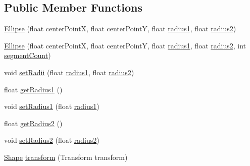 \subsection*{Public Member Functions}
\begin{DoxyCompactItemize}
\item 
\mbox{\hyperlink{classorg_1_1newdawn_1_1slick_1_1geom_1_1_ellipse_ad1dbc867cd52f0db070b125471dc2bf6}{Ellipse}} (float center\+PointX, float center\+PointY, float \mbox{\hyperlink{classorg_1_1newdawn_1_1slick_1_1geom_1_1_ellipse_a26f6d13c3b22a475bc1caf33f84a24b9}{radius1}}, float \mbox{\hyperlink{classorg_1_1newdawn_1_1slick_1_1geom_1_1_ellipse_ad3152cb17acd020ac3ae7bf70526ae9f}{radius2}})
\item 
\mbox{\hyperlink{classorg_1_1newdawn_1_1slick_1_1geom_1_1_ellipse_a01c29689a6bf2672877b1ba6b3d6e616}{Ellipse}} (float center\+PointX, float center\+PointY, float \mbox{\hyperlink{classorg_1_1newdawn_1_1slick_1_1geom_1_1_ellipse_a26f6d13c3b22a475bc1caf33f84a24b9}{radius1}}, float \mbox{\hyperlink{classorg_1_1newdawn_1_1slick_1_1geom_1_1_ellipse_ad3152cb17acd020ac3ae7bf70526ae9f}{radius2}}, int \mbox{\hyperlink{classorg_1_1newdawn_1_1slick_1_1geom_1_1_ellipse_a08f529daee51987987eda5f422abdd31}{segment\+Count}})
\item 
void \mbox{\hyperlink{classorg_1_1newdawn_1_1slick_1_1geom_1_1_ellipse_a3cf63c73d9aa79988a4f2d68cf2611c1}{set\+Radii}} (float \mbox{\hyperlink{classorg_1_1newdawn_1_1slick_1_1geom_1_1_ellipse_a26f6d13c3b22a475bc1caf33f84a24b9}{radius1}}, float \mbox{\hyperlink{classorg_1_1newdawn_1_1slick_1_1geom_1_1_ellipse_ad3152cb17acd020ac3ae7bf70526ae9f}{radius2}})
\item 
float \mbox{\hyperlink{classorg_1_1newdawn_1_1slick_1_1geom_1_1_ellipse_ae5df5130afe56c439dac29747119ca5a}{get\+Radius1}} ()
\item 
void \mbox{\hyperlink{classorg_1_1newdawn_1_1slick_1_1geom_1_1_ellipse_a8e211ec08a413249489a6855c7eb850b}{set\+Radius1}} (float \mbox{\hyperlink{classorg_1_1newdawn_1_1slick_1_1geom_1_1_ellipse_a26f6d13c3b22a475bc1caf33f84a24b9}{radius1}})
\item 
float \mbox{\hyperlink{classorg_1_1newdawn_1_1slick_1_1geom_1_1_ellipse_afad8a29eff0ab082da1c01da7228464a}{get\+Radius2}} ()
\item 
void \mbox{\hyperlink{classorg_1_1newdawn_1_1slick_1_1geom_1_1_ellipse_ac172de7810cab47810a23c6661515e89}{set\+Radius2}} (float \mbox{\hyperlink{classorg_1_1newdawn_1_1slick_1_1geom_1_1_ellipse_ad3152cb17acd020ac3ae7bf70526ae9f}{radius2}})
\item 
\mbox{\hyperlink{classorg_1_1newdawn_1_1slick_1_1geom_1_1_shape}{Shape}} \mbox{\hyperlink{classorg_1_1newdawn_1_1slick_1_1geom_1_1_ellipse_a100ff1837af22a13088dd9b93cc898ab}{transform}} (Transform transform)
\end{DoxyCompactItemize}
